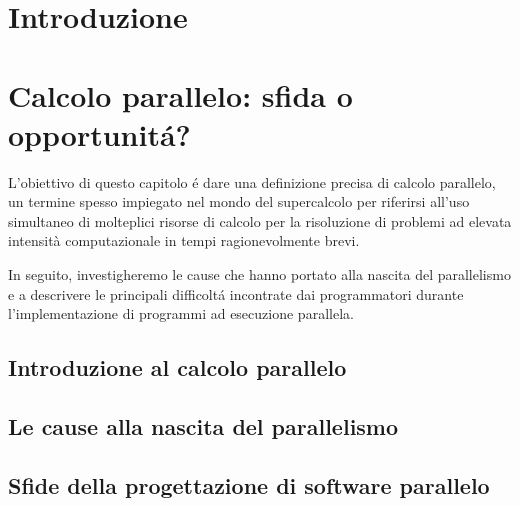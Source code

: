 \documentclass[
	a4paper,
	twoside,
	12pt
]{book}
\begin{document}
\frontmatter


\tableofcontents

\mainmatter
\chapter*{Introduzione}

\chapter{Calcolo parallelo: sfida o opportunit\'a?}
\label{cap1}
L'obiettivo di questo capitolo \'e dare una definizione precisa di calcolo parallelo, un termine spesso impiegato nel mondo
del supercalcolo per riferirsi all’uso simultaneo di molteplici risorse di calcolo per la risoluzione di problemi ad elevata intensità computazionale in tempi ragionevolmente brevi.

In seguito, investigheremo le cause che hanno portato alla nascita del parallelismo e a descrivere le principali difficolt\'a incontrate dai programmatori durante l'implementazione di programmi ad esecuzione parallela.
\section{Introduzione al calcolo parallelo}
\label{par1.1}

\section{Le cause alla nascita del parallelismo}
\label{par1.2}

\section{Sfide della progettazione di software parallelo}
\label{par1.3}

\backmatter



\end{document}

